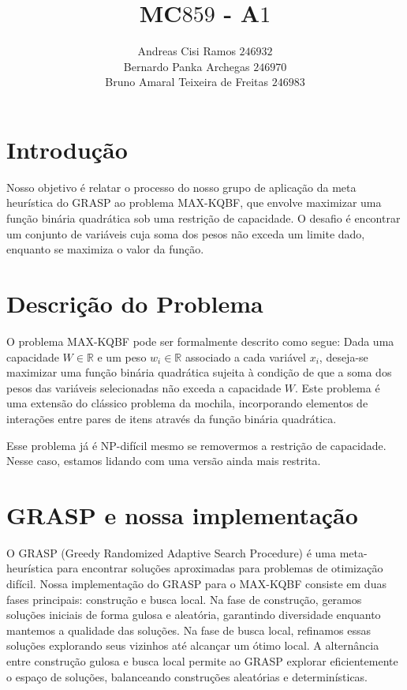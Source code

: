 \documentclass{article}
\title{MC$859$ - A$1$}
\author{Andreas Cisi Ramos $246932$ \\
Bernardo Panka Archegas $246970$ \\
Bruno Amaral Teixeira de Freitas $246983$ \\}
\date{}
\begin{document}
\doublespacing
\maketitle

\section{Introdução}

Nosso objetivo é relatar o processo do nosso grupo de aplicação da meta heurística do GRASP ao problema MAX-KQBF, que envolve maximizar uma função binária quadrática sob uma restrição de capacidade. O desafio é encontrar um conjunto de variáveis cuja soma dos pesos não exceda um limite dado, enquanto se maximiza o valor da função.

\section{Descrição do Problema}

O problema MAX-KQBF pode ser formalmente descrito como segue: Dada uma capacidade $W \in \mathbb{R}$ e um peso $w_i \in \mathbb{R}$ associado a cada variável $x_i$, deseja-se maximizar uma função binária quadrática sujeita à condição de que a soma dos pesos das variáveis selecionadas não exceda a capacidade $W$. Este problema é uma extensão do clássico problema da mochila, incorporando elementos de interações entre pares de itens através da função binária quadrática.

Esse problema já é NP-difícil mesmo se removermos a restrição de capacidade. Nesse caso, estamos lidando com uma versão ainda mais restrita.

\section{GRASP e nossa implementação}

O GRASP (Greedy Randomized Adaptive Search Procedure) é uma meta-heurística para encontrar soluções aproximadas para problemas de otimização difícil. Nossa implementação do GRASP para o MAX-KQBF consiste em duas fases principais: construção e busca local. Na fase de construção, geramos soluções iniciais de forma gulosa e aleatória, garantindo diversidade enquanto mantemos a qualidade das soluções. Na fase de busca local, refinamos essas soluções explorando seus vizinhos até alcançar um ótimo local. A alternância entre construção gulosa e busca local permite ao GRASP explorar eficientemente o espaço de soluções, balanceando construções aleatórias e determinísticas.
\end{document}
